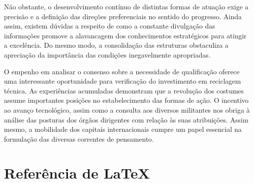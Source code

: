 \documentclass[fleqn]{profmat-cefet}
\begin{document}
Não obstante, o desenvolvimento contínuo de distintas formas de atuação exige a
precisão e a definição das direções preferenciais no sentido do progresso. Ainda
assim, existem dúvidas a respeito de como a constante divulgação das informações
promove a alavancagem dos conhecimentos estratégicos para atingir a excelência.
Do mesmo modo, a consolidação das estruturas obstaculiza a apreciação da
importância das condições inegavelmente apropriadas. 

O empenho em analisar o consenso sobre a necessidade de qualificação oferece uma
interessante oportunidade para verificação do investimento em reciclagem
técnica. As experiências acumuladas demonstram que a revolução dos costumes
assume importantes posições no estabelecimento das formas de ação. O incentivo
ao avanço tecnológico, assim como a consulta aos diversos militantes nos obriga
à análise das posturas dos órgãos dirigentes com relação às suas atribuições.
Assim mesmo, a mobilidade dos capitais internacionais cumpre um papel essencial
na formulação das diversas correntes de pensamento. 




\appendix

\chapter{Referência de \LaTeX}
\label{cap:referencia_de_latex}
\end{document}

